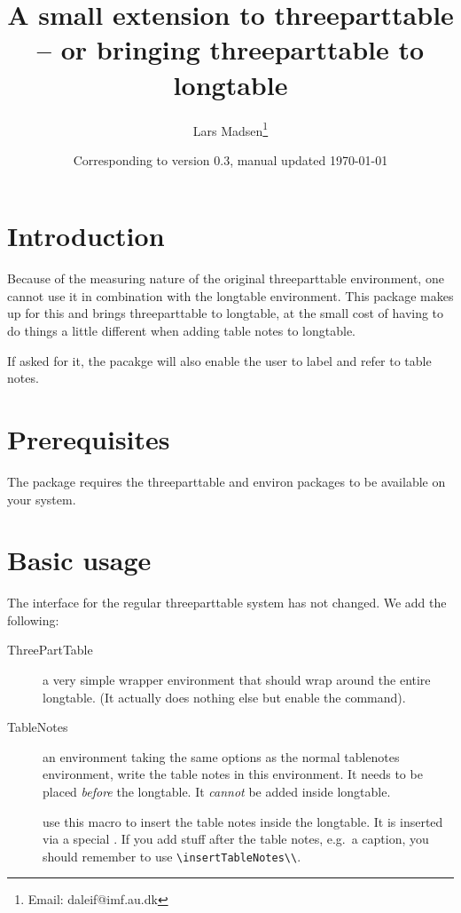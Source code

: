 \documentclass[a4paper,article]{memoir}
\newcommand\pkg{\jobname\xspace}
\newcommand\tpt{threeparttable\xspace}
\begin{document}
\title{A small extension to threeparttable \\ -- or bringing
  threeparttable to longtable}

\author{Lars Madsen\thanks{Email: daleif@imf.au.dk}}

\date{Corresponding to version 0.3, manual updated \today}

\maketitle

\section{Introduction}
\label{sec:introduction}

Because of the measuring nature of the original \tpt
environment, one cannot use it in combination with the longtable
environment. This package makes up for this and brings \tpt
to longtable, at the small cost of having to do things a little
different when adding table notes to longtable.

If asked for it, the pacakge will also enable the user to label and
refer to table notes.


\section{Prerequisites}
\label{sec:prerequisites}

The \pkg package requires the \tpt and environ packages to
be available on your system.

\section{Basic usage}
\label{sec:basic-usage}

The interface for the regular \tpt system has not changed. We add the
following:
\begin{description}
\item[ThreePartTable] a very simple wrapper environment that should
  wrap around the entire longtable. (It actually does nothing else but
  enable the  command).
\item[TableNotes] an environment taking the same options as the normal
  table\-notes environment, write the table notes in this environment.
  It needs to be placed \emph{before} the longtable. It \emph{cannot}
  be added inside longtable.
\item[] use this macro to insert the table notes
  inside the longtable. It is inserted via a special
  . If you add stuff after the table notes, e.g.\ a
  caption, you should remember to use \verb+\insertTableNotes\\+.
\end{description}
\end{document}
